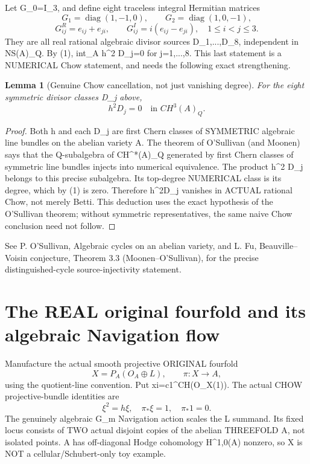 \documentclass[11pt]{article}
\newtheorem{lemma}{Lemma}
\begin{document}
Let G_0=I_3, and define eight traceless integral Hermitian matrices
\[
G_1=\operatorname{diag}(1,-1,0),\qquad
G_2=\operatorname{diag}(1,0,-1),
\]
\[
G_{ij}^R=e_{ij}+e_{ji},\qquad
G_{ij}^I=i(e_{ij}-e_{ji}),\quad
1\le i<j\le3.
\]
They are all real rational algebraic divisor sources
D_1,...,D_8, independent in NS(A)_Q.
By (1), int_A h^2 D_j=0 for j=1,...,8.
This last statement is a NUMERICAL Chow statement,
and needs the following exact strengthening.

\begin{lemma}[Genuine Chow cancellation, not just vanishing degree]
For the eight symmetric divisor classes D_j above,
\[
\boxed{h^2D_j=0\quad\text{in }CH^3(A)_Q.}
\tag{2}
\]
\end{lemma}
\begin{proof}
Both h and each D_j are first Chern classes of SYMMETRIC
algebraic line bundles on the abelian variety A.
The theorem of O'Sullivan (and Moonen) says that
the Q-subalgebra of CH^*(A)_Q generated by
first Chern classes of symmetric line bundles
injects into numerical equivalence.
The product h^2 D_j belongs to this precise
subalgebra. Its top-degree NUMERICAL class
is its degree, which by (1) is zero.
Therefore h^2D_j vanishes in ACTUAL
rational Chow, not merely Betti.
This deduction uses the exact
hypothesis of the O'Sullivan theorem;
without symmetric representatives,
the same naive Chow conclusion need not follow.
\end{proof}

See P. O'Sullivan, Algebraic cycles on an abelian variety,
and L. Fu, Beauville--Voisin conjecture, Theorem 3.3
(Moonen--O'Sullivan), for the precise distinguished-cycle
source-injectivity statement.

\section{The REAL original fourfold and its algebraic Navigation flow}
Manufacture the actual smooth projective ORIGINAL fourfold
\[
\boxed{X=P_A(O_A\oplus L),\qquad\pi:X\to A,}
\tag{3}
\]
using the quotient-line convention.
Put xi=c1^CH(O_X(1)).
The actual CHOW projective-bundle identities are
\[
\boxed{\xi^2=h\xi,\quad\pi_*\xi=1,\quad\pi_*1=0.}
\tag{4}
\]
The genuinely algebraic G_m Navigation action scales the
L summand. Its fixed locus consists of TWO actual disjoint
copies of the abelian THREEFOLD A, not isolated points.
A has off-diagonal Hodge cohomology H^{1,0}(A) nonzero,
so X is NOT a cellular/Schubert-only toy example.
\end{document}
